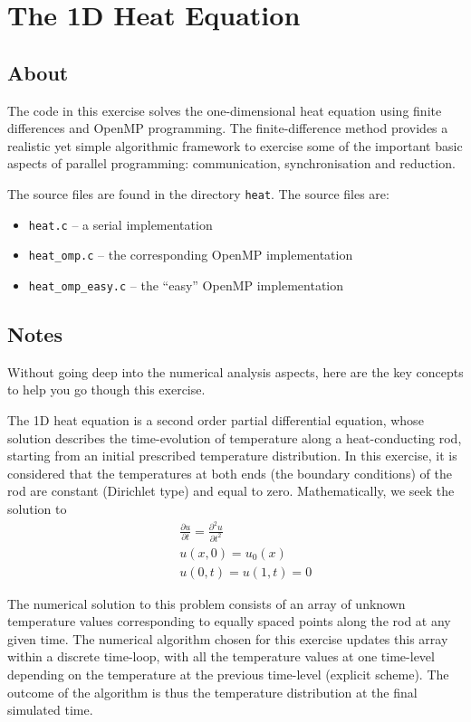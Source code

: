 \documentclass[a4paper, 12pt]{article}
\def \cc   {\tt }               %
\begin{document}
\section{The 1D Heat Equation}
\label{heat}

\subsection*{About}

The code in this exercise solves the one-dimensional heat equation
using finite differences and OpenMP programming.  The
finite-difference method provides a realistic yet simple algorithmic
framework to exercise some of the important basic aspects of parallel
programming: communication, synchronisation and reduction.

The source files are found in the directory {\cc heat}.  The source files are:
%
\begin{itemize}
  \item {\cc heat.c} -- a serial implementation
  \item {\cc heat\_omp.c} -- the corresponding OpenMP implementation
  \item {\cc heat\_omp\_easy.c} -- the ``easy'' OpenMP implementation
\end{itemize}


\subsection*{Notes}

Without going deep into the numerical analysis aspects, here are the
key concepts to help you go though this exercise.

The 1D heat equation is a second order partial differential equation,
whose solution describes the time-evolution of temperature along a
heat-conducting rod, starting from an initial prescribed temperature
distribution.  In this exercise, it is considered that the
temperatures at both ends (the boundary conditions) of the rod are
constant (Dirichlet type) and equal to zero.  Mathematically, we seek
the solution to
%
\begin{eqnarray}
  && \frac{\partial u}{\partial t} = \frac{\partial^2 u}{\partial t^2} \\
  && u(x, 0) = u_0(x) \\
  && u(0, t) = u(1, t) = 0
\end{eqnarray}

The numerical solution to this problem consists of an array of unknown
temperature values corresponding to equally spaced points along the
rod at any given time.  The numerical algorithm chosen for this
exercise updates this array within a discrete time-loop, with all the
temperature values at one time-level depending on the temperature at
the previous time-level (explicit scheme).  The outcome of the
algorithm is thus the temperature distribution at the final simulated
time.
\end{document}
